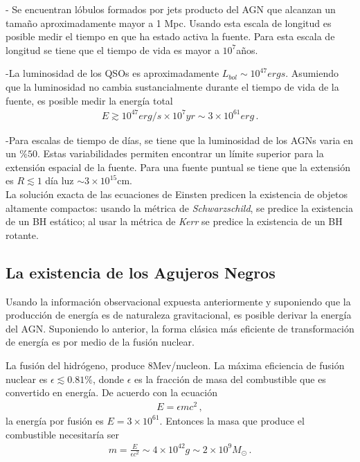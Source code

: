 - Se encuentran lóbulos formados por jets producto del AGN
que alcanzan un tamaño aproximadamente mayor a 1 Mpc. Usando esta escala de longitud es posible medir el tiempo en que ha estado activa la fuente. Para esta escala de longitud se tiene que el tiempo de vida es mayor a $10^{7}$años.

-La luminosidad de los QSOs es aproximadamente $L_{bol}\sim 10^{47}ergs$. Asumiendo que la luminosidad no cambia sustancialmente durante el tiempo de vida de la fuente, es posible medir la energía total
\begin{align}
E \gtrsim 10^{47} erg/s \times 10^{7}yr \sim 3\times 10^{61}erg\,.
\end{align}

-Para escalas de tiempo de días, se tiene que la luminosidad de los AGNs varia en un $\% 50$. Estas variabilidades permiten encontrar un límite superior para la extensión espacial de la fuente. Para una fuente puntual se tiene que la extensión es $R \lesssim 1$ día luz $\sim3\times10^{15}$cm.\\

La solución exacta de las ecuaciones de Einsten predicen la existencia de objetos altamente compactos: usando la métrica de {\it{Schwarzschild}}, se predice la existencia de un BH estático; al usar la métrica de {\it{Kerr}} se predice la existencia de un BH rotante. 

	\subsection{La existencia de los Agujeros Negros}
	\label{subsec:Why_a_BH}

Usando la información observacional expuesta anteriormente y suponiendo que la producción de energía es de naturaleza gravitacional, es posible derivar la energía del AGN. Suponiendo lo anterior, la forma clásica más eficiente de transformación de energía es por medio de la fusión nuclear. 

La fusión del hidrógeno, produce 8Mev/nucleon. La máxima eficiencia de fusión nuclear es $\epsilon \lesssim 0.81 \%$, donde $\epsilon$ es la fracción de masa del combustible que es convertido en energía. De acuerdo con la ecuación 
\begin{align}
E=\epsilon mc^{2}\,,
\end{align}
%
la energía por fusión es $E=3\times10^{61}$. Entonces la masa que produce el combustible necesitaría ser 
\begin{align}
m=\frac{E}{\epsilon c^{2}} \sim 4\times10^{42}g\sim 2\times10^{9}M_{\odot}\,.
\end{align}


